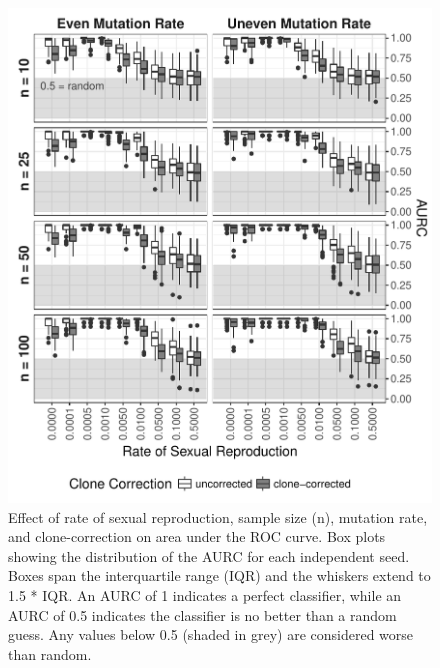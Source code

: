 \documentclass[]{article}
\theoremstyle{definition}
\theoremstyle{definition}
\theoremstyle{remark}
\begin{document}
\begin{figure}
\centering
\includegraphics[width=1.00000\textwidth]{figure/AURC_box_plot.pdf}
\caption{Effect of rate of sexual reproduction, sample size (n),
mutation rate, and clone-correction on area under the ROC curve. Box
plots showing the distribution of the AURC for each independent seed.
Boxes span the interquartile range (IQR) and the whiskers extend to 1.5
* IQR. An AURC of 1 indicates a perfect classifier, while an AURC of 0.5
indicates the classifier is no better than a random guess. Any values
below 0.5 (shaded in grey) are considered worse than
random.}\label{fig:sim2}
\end{figure}
\end{document}
